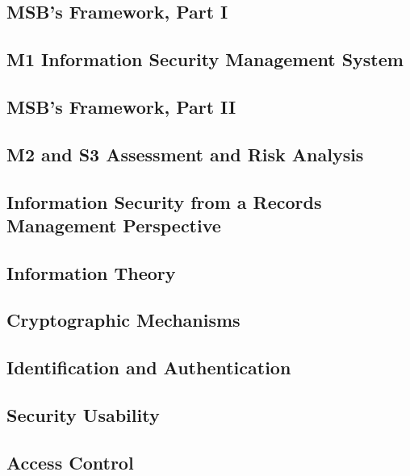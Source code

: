 \subsection{MSB's Framework, Part I}


\subsection{M1 Information Security Management System}


\subsection{MSB's Framework, Part II}


\subsection{M2 and S3 Assessment and Risk Analysis}


\subsection{Information Security from a Records Management Perspective}


\subsection{Information Theory}


\subsection{Cryptographic Mechanisms}


\subsection{Identification and Authentication}


\subsection{Security Usability}


\subsection{Access Control}



